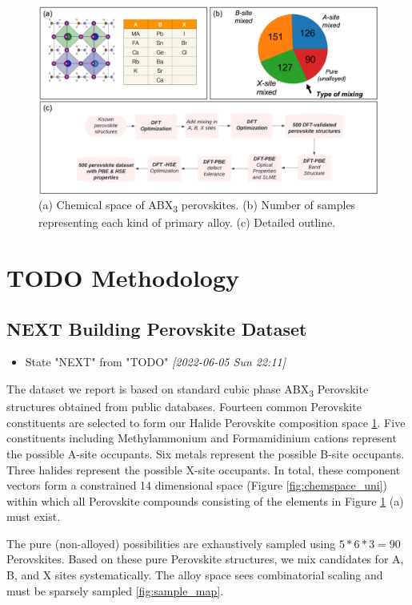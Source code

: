 \documentclass[twoside, twocolumn, 9pt, draft]{article}
\begin{document}
\begin{figure}
\centering
\includegraphics[h,width=.9\linewidth]{outline.png}
\caption{\label{fig:outline} (a) Chemical space of ABX\textsubscript{3} perovskites. (b) Number of samples representing each kind of primary alloy. (c) Detailed outline.}
\end{figure}

\section*{{\bfseries\sffamily TODO} Methodology}
\label{sec:org32a907d}
\subsection*{{\bfseries\sffamily NEXT} Building Perovskite Dataset}
\label{sec:org138f49c}
\begin{itemize}
\item State "NEXT"       from "TODO"       \textit{[2022-06-05 Sun 22:11]}
\end{itemize}
The dataset we report is based on standard cubic phase ABX\textsubscript{3}
Perovskite structures obtained from public databases. Fourteen common
Perovskite constituents are selected to form our Halide Perovskite
composition space \ref{fig:outline}. Five constituents including
Methylammonium and Formamidinium cations represent the possible A-site
occupants. Six metals represent the possible B-site occupants. Three
halides represent the possible X-site occupants. In total, these
component vectors form a constrained 14 dimensional space (Figure
\ref{fig:chemspace_uni}) within which all Perovskite compounds
consisting of the elements in Figure \ref{fig:outline} (a) must exist.

The pure (non-alloyed) possibilities are exhaustively sampled using
\(5*6*3 = 90\) Perovskites. Based on these pure Perovskite structures,
we mix candidates for A, B, and X sites systematically. The alloy
space sees combinatorial scaling and must be sparsely sampled
\ref{fig:sample_map}.
\end{document}
